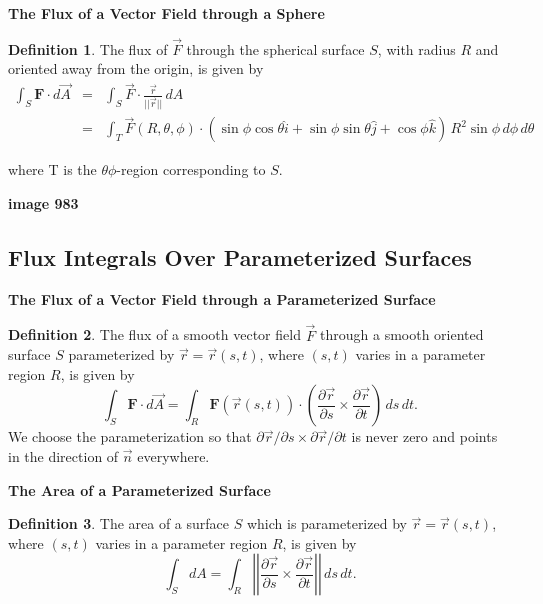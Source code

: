 \documentclass[12pt, a4paper]{article}
\theoremstyle{plain}
\theoremstyle{definition}
\newtheorem{definition}{Definition}[section]
\theoremstyle{remark}
\begin{document}
\textbf{The Flux of a Vector Field through a Sphere}

\begin{definition}
The flux of $\vec{F}$ through the spherical surface $S$, with radius $R$ and oriented away from the origin, is given by
\begin{eqnarray*}
 \int_S \textbf{F} \cdot d \vec{A} &=& \int_S \vec{F} \cdot \frac{\vec{r}}{||\vec{r}||} \,dA \\
&=& \int_T \vec{F}(R, \theta, \phi) \cdot (\sin \phi \cos \theta \hat{i} + \sin \phi \sin \theta \hat{j} + \cos \phi \hat{k}) \, R^2 \sin \phi \, d \phi \, d \theta
\end{eqnarray*}

where T is the $\theta \phi$-region corresponding to $S$.
\end{definition}

\textbf{image 983}












\newpage
\subsection{Flux Integrals Over Parameterized Surfaces}


\textbf{The Flux of a Vector Field through a Parameterized Surface}


\begin{definition}
The flux of a smooth vector field $\vec{F}$ through a smooth oriented surface $S$ parameterized by $\vec{r} = \vec{r}(s, t)$, where $(s, t)$ varies in a parameter region $R$, is given by 
$$ \int_S \textbf{F} \cdot d \vec{A} = \int_R \textbf{F}(\vec{r}(s, t)) \cdot \left( \frac{\partial \vec{r}}{\partial s} \times \frac{\partial \vec{r}}{\partial t}  \right) \,ds \, dt. $$
We choose the parameterization so that $\partial \vec{r} / \partial s \times \partial \vec{r} / \partial t$ is never zero and points in the direction of $\vec{n}$ everywhere.
\end{definition}

\textbf{The Area of a Parameterized Surface}

\begin{definition}
The area of a surface $S$ which is parameterized by $\vec{r} = \vec{r}(s, t)$, where $(s, t)$ varies in a parameter region $R$, is given by 
$$\int_S dA = \int_R \left| \left| \frac{\partial \vec{r}}{\partial s} \times \frac{\partial \vec{r}}{\partial t}      \right| \right| \, ds \, dt. $$
\end{definition}
\end{document}
